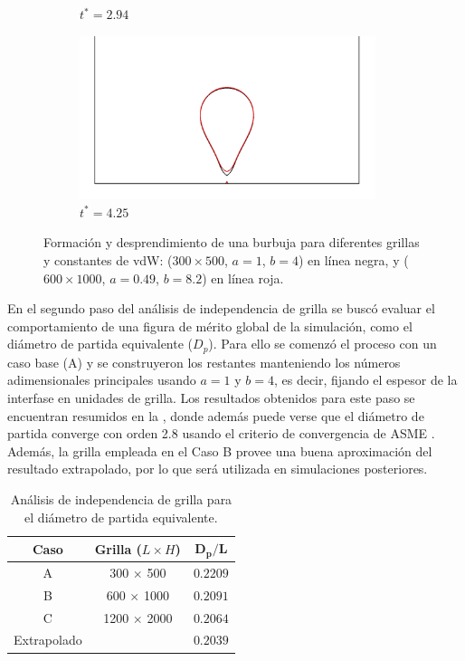\begin{figure}[htb]
\begin{subfigure}[t]{0.45\textwidth}
        \caption{$t^* = 2.94$}
    \end{subfigure}    
    \begin{subfigure}[t]{0.45\textwidth}
        \centering
        \includegraphics[width=0.95\textwidth]{Imagenes/HetBoiling/GridIndep_1/130}
        \caption{$t^* = 4.25$}
    \end{subfigure}    
    \caption{Formaci\'on y desprendimiento de una burbuja para diferentes grillas y constantes de vdW: ($300 \times 500$, $a=1$, $b=4$) en l\'inea negra, y ($600 \times 1000$, $a=0.49$, $b=8.2$) en l\'inea roja.}
    \label{fig:bubble2D_step1}
\end{figure}

En el segundo paso del an\'alisis de independencia de grilla se busc\'o evaluar el comportamiento de una figura de m\'erito global de la simulaci\'on, como el di\'ametro de partida equivalente ($D_p$). Para ello se comenz\'o el proceso con un caso base (A) y se construyeron los restantes manteniendo los n\'umeros adimensionales principales usando $a=1$ y $b=4$, es decir, fijando el espesor de la interfase en unidades de grilla. Los resultados obtenidos para este paso se encuentran resumidos en la , donde adem\'as puede verse que el di\'ametro de partida converge con orden 2.8 usando el criterio de convergencia de ASME \cite{freitas_asmes_2003}. Adem\'as, la grilla empleada en el Caso B provee una buena aproximaci\'on del resultado extrapolado, por lo que ser\'a utilizada en simulaciones posteriores.

\begin{table}[ht]
	\centering
    \begin{tabular}{c c c}
	    \toprule
        \bf Caso & \bf Grilla ($L\times H$) & $\bm{D_p/L}$  \\
        \midrule
		A & 300  $\times$ 500  &  $0.2209$ \\
		B & 600  $\times$ 1000 &  $0.2091$ \\		
		C & 1200 $\times$ 2000 &  $0.2064$ \\		
		Extrapolado &          &  $0.2039$ \\		
        \bottomrule
	\end{tabular}
	\caption{An\'alisis de independencia de grilla para el di\'ametro de partida equivalente.}
	\label{tab:gridindep_step2}
\end{table} 


